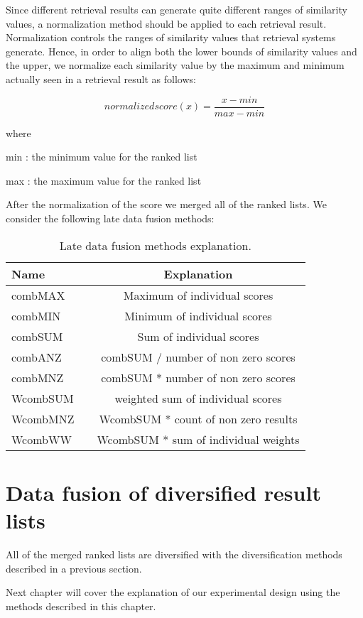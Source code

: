 Since different retrieval results can generate quite different ranges of similarity values, a normalization
method should be applied to each retrieval result. Normalization controls the ranges of similarity values that retrieval systems generate. Hence, in order to align both the lower bounds of similarity values and the upper, we normalize each similarity value
by the maximum and minimum actually seen in a retrieval result as follows:

\begin{equation}
normalized score(x) = \frac{x-min}{max-min}
\end{equation}

where

min : the minimum value for the ranked list

max : the maximum value for the ranked list

\bigskip

After the normalization of the score we merged all of the ranked lists. We consider the following late data fusion methods:
\bigskip

\begin{table}[H]
\begin{center}
\caption{Late data fusion methods explanation.}
\begin{tabular}{lcc}
\midrule
Name &   & Explanation \\
\midrule
combMAX &   & Maximum of individual scores \\
combMIN &   & Minimum of individual scores \\
combSUM &   & Sum of individual scores \\
combANZ &   & combSUM / number of non zero scores \\
combMNZ &   & combSUM * number of non zero scores \\
WcombSUM &   & weighted sum of individual scores \\
WcombMNZ &   & WcombSUM * count of non zero results \\
WcombWW &   & WcombSUM * sum of individual weights \\
\bottomrule
\end{tabular}
\end{center}
\end{table}


\section{Data fusion of diversified result lists}

All of the merged ranked lists are diversified with the diversification methods described in a previous section.

Next chapter will cover the explanation of our experimental design using the methods described in this chapter.